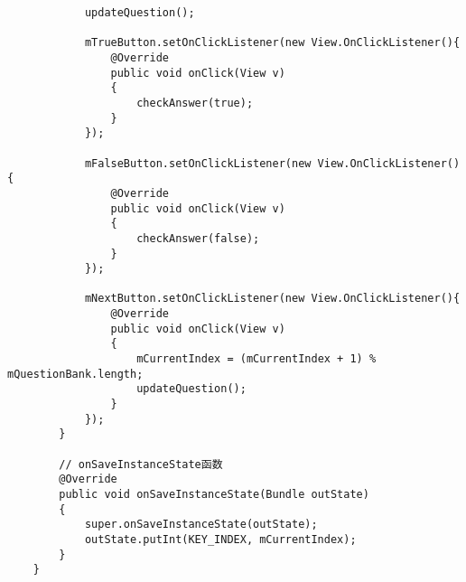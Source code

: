 \documentclass[a4paper,left=2.5cm,right=2.5cm,11pt]{article}
\begin{document}
\begin{lstlisting}
			updateQuestion();

			mTrueButton.setOnClickListener(new View.OnClickListener(){
				@Override
				public void onClick(View v)
				{
					checkAnswer(true);
				}
			});

			mFalseButton.setOnClickListener(new View.OnClickListener(){
				@Override
				public void onClick(View v)
				{
					checkAnswer(false);
				}
			});

			mNextButton.setOnClickListener(new View.OnClickListener(){
				@Override
				public void onClick(View v)
				{
					mCurrentIndex = (mCurrentIndex + 1) % mQuestionBank.length;
					updateQuestion();
				}
			});
		}

		// onSaveInstanceState函数
		@Override
		public void onSaveInstanceState(Bundle outState)
		{
			super.onSaveInstanceState(outState);
			outState.putInt(KEY_INDEX, mCurrentIndex);
		}
	}		
	\end{lstlisting}
\end{document}
